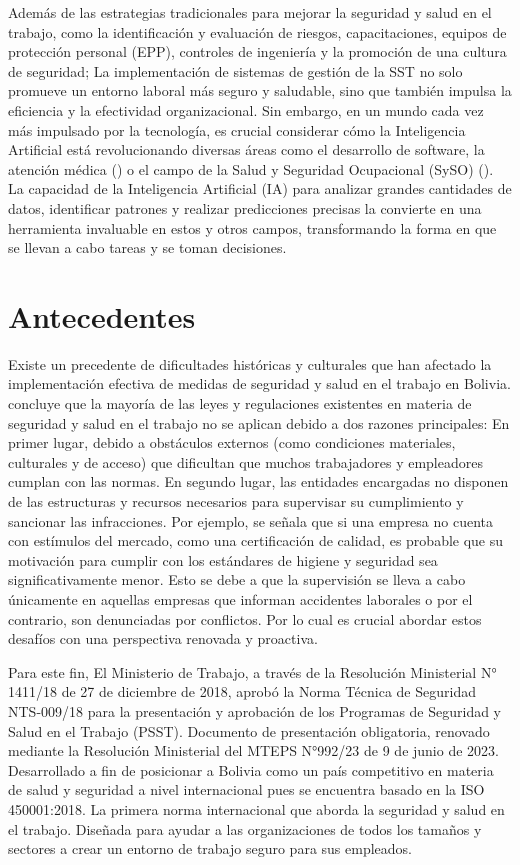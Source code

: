 Además de las estrategias tradicionales para mejorar la seguridad y salud en el trabajo, como la identificación y evaluación de riesgos, capacitaciones, equipos de protección personal (EPP), controles de ingeniería y la promoción de una cultura de seguridad; La implementación de sistemas de gestión de la SST no solo promueve un entorno laboral más seguro y saludable, sino que también impulsa la eficiencia y la efectividad organizacional. Sin embargo, en un mundo cada vez más impulsado por la tecnología, es crucial considerar cómo la Inteligencia Artificial está revolucionando diversas áreas como el desarrollo de software, la atención médica (\cite{Ellahham2020}) o el campo de la Salud y Seguridad Ocupacional (SySO) (\cite{Jarota2023}). La capacidad de la Inteligencia Artificial (IA) para analizar grandes cantidades de datos, identificar patrones y realizar predicciones precisas la convierte en una herramienta invaluable en estos y otros campos, transformando la forma en que se llevan a cabo tareas y se toman decisiones. 
\section{Antecedentes}

Existe un precedente de dificultades históricas y culturales que han afectado la implementación efectiva de medidas de seguridad y salud en el trabajo en Bolivia. \textcite{cervantesdiagnostico} concluye que la mayoría de las leyes y regulaciones existentes en materia de seguridad y salud en el trabajo no se aplican debido a dos razones principales: En primer lugar, debido a obstáculos externos (como condiciones materiales, culturales y de acceso) que dificultan que muchos trabajadores y empleadores cumplan con las normas. En segundo lugar, las entidades encargadas no disponen de las estructuras y recursos necesarios para supervisar su cumplimiento y sancionar las infracciones. Por ejemplo, se señala que si una empresa no cuenta con estímulos del mercado, como una certificación de calidad, es probable que su motivación para cumplir con los estándares de higiene y seguridad sea significativamente menor. Esto se debe a que la supervisión se lleva a cabo únicamente en aquellas empresas que informan accidentes laborales o por el contrario, son denunciadas por conflictos. Por lo cual es crucial abordar estos desafíos con una perspectiva renovada y proactiva.

Para este fin, El Ministerio de Trabajo, a través de la Resolución Ministerial N° 1411/18 de 27 de diciembre de 2018, aprobó la Norma Técnica de Seguridad NTS-009/18 para la presentación y aprobación de los
Programas de Seguridad y Salud en el Trabajo (PSST). Documento de presentación obligatoria, renovado mediante la Resolución Ministerial del MTEPS N°992/23 de 9 de junio de 2023. Desarrollado a fin de posicionar a Bolivia como un país competitivo en materia de salud y seguridad a nivel internacional pues se encuentra basado en la ISO 450001:2018. La primera norma internacional que aborda la seguridad y salud en el trabajo. Diseñada para ayudar a las organizaciones de todos los tamaños y sectores a crear un entorno de trabajo seguro para sus empleados.

